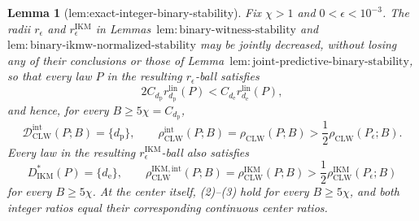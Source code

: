 \documentclass{article}
\newtheorem{lemma}{Lemma}
\begin{document}
\begin{lemma}[lem:exact-integer-binary-stability]\label{lem:exact-integer-binary-stability}
Fix \(\chi>1\) and \(0<\epsilon<10^{-3}\).  The radii \(r_\epsilon\) and \(r_\epsilon^{\mathrm{IKM}}\) in Lemmas~\(\mathrm{lem{:}binary\text{-}witness\text{-}stability}\) and \(\mathrm{lem{:}binary\text{-}ikmw\text{-}normalized\text{-}stability}\) may be jointly decreased, without losing any of their conclusions or those of Lemma~\(\mathrm{lem{:}joint\text{-}predictive\text{-}binary\text{-}stability}\), so that every law \(P\) in the resulting \(r_\epsilon\)-ball satisfies
\[
 2C_{d_{\mathrm p}}r_{d_{\mathrm p}}^{\mathrm{lin}}(P)
 <C_{d_{\mathrm e}}r_{d_{\mathrm e}}^{\mathrm{lin}}(P),   \tag{1}
\]
and hence, for every \(B\ge5\chi=C_{d_{\mathrm p}}\),
\[
 \mathcal D_{\mathrm{CLW}}^{\mathrm{int}}(P;B)=\{d_{\mathrm p}\},
 \qquad
 \rho_{\mathrm{CLW}}^{\mathrm{int}}(P;B)=\rho_{\mathrm{CLW}}(P;B)
 >\frac12\rho_{\mathrm{CLW}}(P_\epsilon;B).               \tag{2}
\]
Every law in the resulting \(r_\epsilon^{\mathrm{IKM}}\)-ball also satisfies
\[
 D_{\mathrm{IKM}}^*(P)=\{d_{\mathrm e}\},
 \qquad
 \rho_{\mathrm{CLW}}^{\mathrm{IKM,int}}(P;B)
 =\rho_{\mathrm{CLW}}^{\mathrm{IKM}}(P;B)
 >\frac12\rho_{\mathrm{CLW}}^{\mathrm{IKM}}(P_\epsilon;B) \tag{3}
\]
for every \(B\ge5\chi\).  At the center itself, (2)--(3) hold for every \(B\ge5\chi\), and both integer ratios equal their corresponding continuous center ratios.
\end{lemma}
\end{document}
